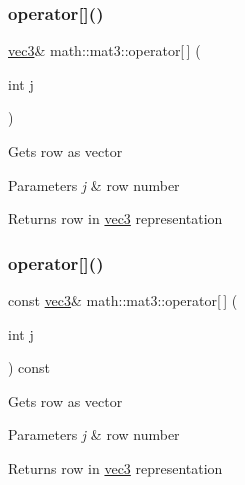 \subsubsection{\texorpdfstring{operator[]()}{operator[]()}\hspace{0.1cm}{\footnotesize\ttfamily [1/2]}}
{\footnotesize\ttfamily \hyperlink{structmath_1_1vec3}{vec3}\& math\+::mat3\+::operator\mbox{[}$\,$\mbox{]} (\begin{DoxyParamCaption}\item[{int}]{j }\end{DoxyParamCaption})\hspace{0.3cm}{\ttfamily [inline]}}

Gets row as vector 
\begin{DoxyParams}{Parameters}
{\em j} & row number \\
\hline
\end{DoxyParams}
\begin{DoxyReturn}{Returns}
row in \hyperlink{structmath_1_1vec3}{vec3} representation 
\end{DoxyReturn}
\mbox{\label{structmath_1_1mat3_ace87c667cada9740a99e70c7f7181c3b}} 
\subsubsection{\texorpdfstring{operator[]()}{operator[]()}\hspace{0.1cm}{\footnotesize\ttfamily [2/2]}}
{\footnotesize\ttfamily const \hyperlink{structmath_1_1vec3}{vec3}\& math\+::mat3\+::operator\mbox{[}$\,$\mbox{]} (\begin{DoxyParamCaption}\item[{int}]{j }\end{DoxyParamCaption}) const\hspace{0.3cm}{\ttfamily [inline]}}

Gets row as vector 
\begin{DoxyParams}{Parameters}
{\em j} & row number \\
\hline
\end{DoxyParams}
\begin{DoxyReturn}{Returns}
row in \hyperlink{structmath_1_1vec3}{vec3} representation 
\end{DoxyReturn}
\mbox{\label{structmath_1_1mat3_a9b381439856d95b51c8b87f80ece05dc}} 
